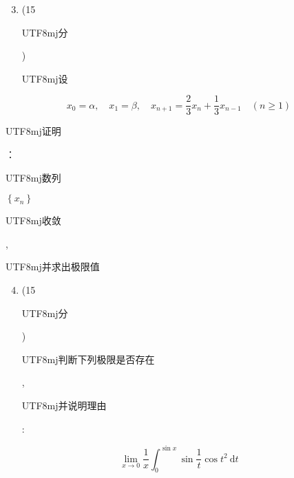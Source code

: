 \documentclass[10pt]{article}
\begin{document}
\begin{enumerate}
  \setcounter{enumi}{2}
  \item (15 \begin{CJK}{UTF8}{mj}分\end{CJK}) \begin{CJK}{UTF8}{mj}设\end{CJK}
\end{enumerate}
$$
x_{0}=\alpha, \quad x_{1}=\beta, \quad x_{n+1}=\frac{2}{3} x_{n}+\frac{1}{3} x_{n-1} \quad(n \geq 1)
$$
\begin{CJK}{UTF8}{mj}证明\end{CJK}：\begin{CJK}{UTF8}{mj}数列\end{CJK} $\left\{x_{n}\right\}$ \begin{CJK}{UTF8}{mj}收敛\end{CJK}, \begin{CJK}{UTF8}{mj}并求出极限值\end{CJK}

\begin{enumerate}
  \setcounter{enumi}{3}
  \item (15 \begin{CJK}{UTF8}{mj}分\end{CJK}) \begin{CJK}{UTF8}{mj}判断下列极限是否存在\end{CJK}, \begin{CJK}{UTF8}{mj}并说明理由\end{CJK}:
\end{enumerate}
$$
\lim _{x \rightarrow 0} \frac{1}{x} \int_{0}^{\sin x} \sin \frac{1}{t} \cos t^{2} \mathrm{~d} t
$$
\end{document}
